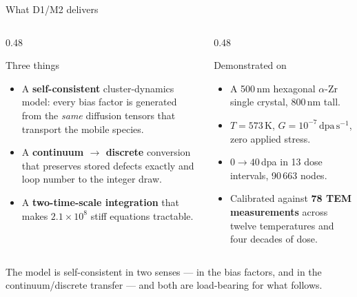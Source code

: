 \documentclass[aspectratio=169,10pt]{beamer}
\newcommand{\foot}[1]{\par\vspace{1ex}%
  \begingroup\footnotesize\raggedright #1\par\endgroup}
\begin{document}
\begin{frame}{What D1/M2 delivers}
\begin{columns}[T]
\begin{column}{0.48\textwidth}
\begin{block}{Three things}
\begin{itemize}\small
  \item A \textbf{self-consistent} cluster-dynamics model: every bias factor is
        generated from the \emph{same} diffusion tensors that transport the
        mobile species.
  \item A \textbf{continuum $\to$ discrete} conversion that preserves stored
        defects exactly and loop number to the integer draw.
  \item A \textbf{two-time-scale integration} that makes $2.1\times10^{8}$
        stiff equations tractable.
\end{itemize}
\end{block}
\end{column}
\begin{column}{0.48\textwidth}
\begin{block}{Demonstrated on}
\begin{itemize}\small
  \item A 500\,nm hexagonal $\alpha$-Zr single crystal, 800\,nm tall.
  \item $T=573$\,K, $G=10^{-7}\,\mathrm{dpa\,s^{-1}}$, zero applied stress.
  \item $0\to40$\,dpa in 13 dose intervals, 90\,663 nodes.
  \item Calibrated against \textbf{78 TEM measurements} across twelve
        temperatures and four decades of dose.
\end{itemize}
\end{block}
\end{column}
\end{columns}
\foot{The model is self-consistent in two senses --- in the bias factors, and
in the continuum/discrete transfer --- and both are load-bearing for what
follows.}
\end{frame}
\end{document}
